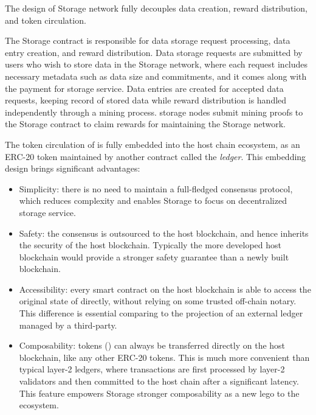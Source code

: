 The design of \projabbrev Storage network fully decouples data creation, reward distribution, and token circulation.

The \projabbrev Storage contract is responsible for data storage request processing, data entry creation, and reward distribution. 
Data storage requests are submitted by users who wish to store data in the \projabbrev Storage network,
where each request includes necessary metadata such as data size and commitments,
and it comes along with the payment for storage service.
Data entries are created for accepted data requests, keeping record of stored data while
reward distribution is handled independently through a mining process.
storage nodes submit mining proofs to the \projabbrev Storage contract to claim rewards for maintaining the \projabbrev Storage network.


The token circulation of \projabbrev is fully embedded into the host chain ecosystem,
as an ERC-20 token maintained by another contract called the \emph{\token ledger}.
% 
This embedding design brings significant advantages:
\begin{itemize}
	\item Simplicity: there is no need to maintain a full-fledged  consensus protocol,
	which reduces complexity and enables \projabbrev Storage to focus on decentralized storage service.

	\item Safety: the consensus is outsourced to the host blockchain, and hence inherits the security of the host blockchain. 
	Typically the more developed host blockchain would provide a stronger safety guarantee than a newly built blockchain.

	\item Accessibility: every smart contract on the host blockchain is able to access the original state of \project directly, without relying on some trusted off-chain notary. This difference is essential comparing to the projection of an external ledger managed by a third-party.

	\item Composability: \projabbrev tokens (\token) can always be transferred directly on the host blockchain, like any other ERC-20 tokens. 
	This is much more convenient than typical layer-2 ledgers, where transactions are first processed by layer-2 validators and then committed to the host chain after a significant latency.
	This feature empowers \projabbrev Storage stronger composability as a new lego to the ecosystem.
\end{itemize}


